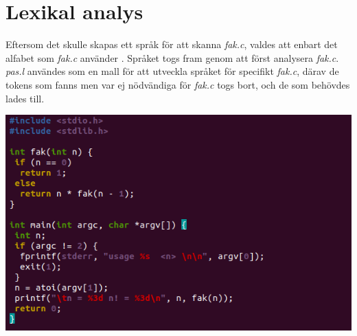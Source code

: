 \section{Lexikal analys}

Eftersom det skulle skapas ett språk för att skanna \textit{fak.c}, valdes att enbart det alfabet
som \textit{fak.c} använder \cite{lexical flex}. Språket togs fram genom att först analysera \textit{fak.c}.
\\ \textit{pas.l} användes som en mall för att utveckla språket för specifikt \textit{fak.c},
därav de tokens som fanns men var ej nödvändiga för \textit{fak.c} togs bort, och de som
behövdes lades till. 

\begin{center}
    \includegraphics[width=\linewidth]{bilder/fak_c.png}
    \label{fig:fak_c}
\end{center}

\newpage


